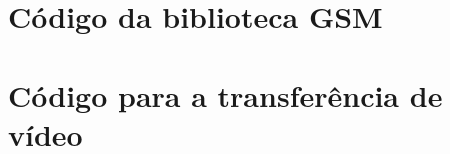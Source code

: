 \begin{apendicesenv}









\chapter{Código da biblioteca GSM}
\label{chap:apendiceGSM}



\chapter{Código para a transferência de vídeo}
\label{chap:apendiceGetVideo}




\end{apendicesenv}
